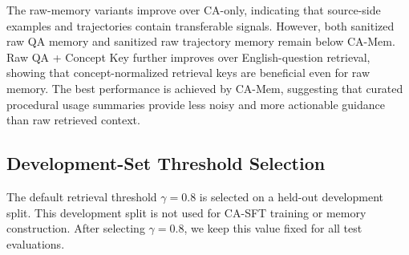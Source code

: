 \documentclass[11pt]{article}
\begin{document}
\begin{table}[!t]
\centering
\scriptsize
\setlength{\tabcolsep}{3pt}
\renewcommand{\arraystretch}{0.95}
\caption{Raw-memory baselines on Global-MMLU with CA-SFT. All methods use the same CA-SFT checkpoint, retrieval encoder, Top-1 retrieval, threshold, fallback behavior, and decoding setting. Raw QA and raw trajectory memories are answer-sanitized before retrieval.}
\label{tab:raw_memory_baselines}
\end{table}

The raw-memory variants improve over CA-only, indicating that source-side examples and trajectories contain transferable signals. However, both sanitized raw QA memory and sanitized raw trajectory memory remain below CA-Mem. Raw QA + Concept Key further improves over English-question retrieval, showing that concept-normalized retrieval keys are beneficial even for raw memory. The best performance is achieved by CA-Mem, suggesting that curated procedural usage summaries provide less noisy and more actionable guidance than raw retrieved context.

\subsection{Development-Set Threshold Selection}
The default retrieval threshold $\gamma=0.8$ is selected on a held-out development split.
This development split is not used for CA-SFT training or memory construction.
After selecting $\gamma=0.8$, we keep this value fixed for all test evaluations.
\end{document}
